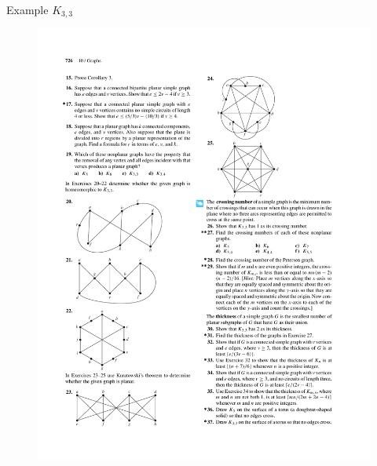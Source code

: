 \documentclass{beamer}
\theoremstyle{definition}
\begin{document}
%             

\begin{frame}{Example $K_{3,3}$}
    \begin{figure}
        \includegraphics[trim={11.5cm 17cm 5.5cm 7.25cm}, clip, width=.5\linewidth]{p726}
    \end{figure}
\end{frame}
\end{document}
